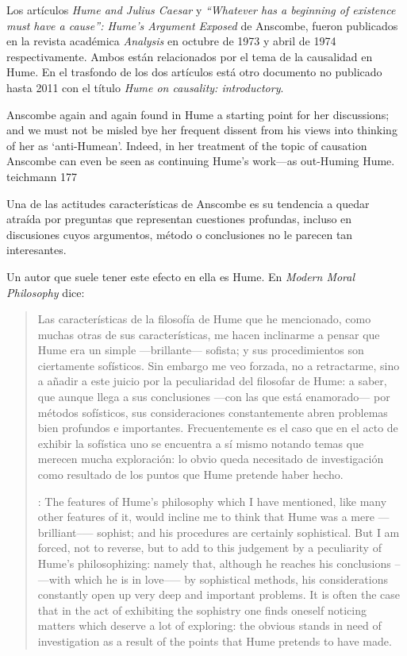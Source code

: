 Los artículos \emph{Hume and Julius Caesar} y \emph{``Whatever has a beginning
  of existence must have a cause'': Hume’s Argument Exposed} de Anscombe, fueron
publicados en la revista académica \emph{Analysis} en octubre de 1973 y abril de
1974 respectivamente. Ambos están relacionados por el tema de la causalidad en
Hume. En el trasfondo de los dos artículos está otro documento no publicado
hasta 2011 con el título \emph{Hume on causality: introductory}.

Anscombe again and again found in Hume a starting point for her discussions; and
we must not be misled bye her frequent dissent from his views into thinking of
her as `anti-Humean'. Indeed, in her treatment of the topic of causation
Anscombe can even be seen as continuing Hume's work---as out-Huming Hume.
teichmann 177

  Una de las actitudes características de Anscombe es su tendencia a quedar
  atraída por preguntas que representan cuestiones profundas, incluso en
  discusiones cuyos argumentos, método o conclusiones no le parecen tan
  interesantes.

  Un autor que suele tener este efecto en ella es Hume. En \emph{Modern Moral
    Philosophy} dice:

  \blockquote[{\cite[172]{anscombe1981mmph}}: The features of Hume’s philosophy
  which I have mentioned, like many other features of it, would incline me to
  think that Hume was a mere ---brilliant--— sophist; and his procedures are
  certainly sophistical. But I am forced, not to reverse, but to add to this
  judgement by a peculiarity of Hume’s philosophizing: namely that, although he
  reaches his conclusions --—with which he is in love--— by sophistical methods,
  his considerations constantly open up very deep and important problems. It is
  often the case that in the act of exhibiting the sophistry one finds oneself
  noticing matters which deserve a lot of exploring: the obvious stands in need of
  investigation as a result of the points that Hume pretends to have made.]{Las
    características de la filosofía de Hume que he mencionado, como muchas otras
    de sus características, me hacen inclinarme a pensar que Hume era un simple
    ---brillante--- sofista; y sus procedimientos son ciertamente sofísticos. Sin
    embargo me veo forzada, no a retractarme, sino a añadir a este juicio por la
    peculiaridad del filosofar de Hume: a saber, que aunque llega a sus
    conclusiones ---con las que está enamorado--- por métodos sofísticos, sus
    consideraciones constantemente abren problemas bien profundos e importantes.
    Frecuentemente es el caso que en el acto de exhibir la sofística uno se
    encuentra a sí mismo notando temas que merecen mucha exploración: lo obvio
    queda necesitado de investigación como resultado de los puntos que Hume
    pretende haber hecho.}

